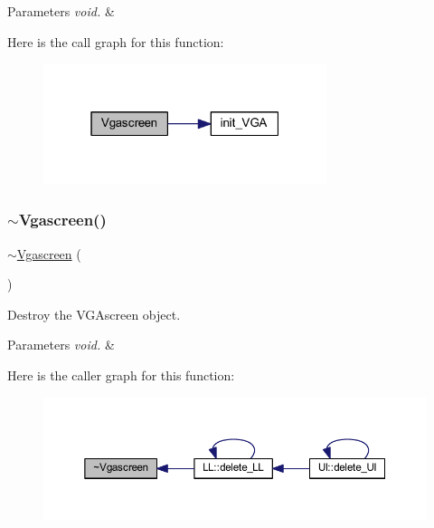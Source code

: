 \begin{DoxyParams}{Parameters}
{\em void.} & \\
\hline
\end{DoxyParams}
Here is the call graph for this function\+:\nopagebreak
\begin{figure}[H]
\begin{center}
\leavevmode
\includegraphics[width=235pt]{class_vgascreen_ad5914fac8c1af8491b92dfe780490191_cgraph}
\end{center}
\end{figure}
\mbox{\label{class_vgascreen_aac39d059f15042b0d763c6a173540552}} 
\subsubsection{\texorpdfstring{$\sim$\+Vgascreen()}{~Vgascreen()}}
{\footnotesize\ttfamily $\sim$\mbox{\hyperlink{class_vgascreen}{Vgascreen}} (\begin{DoxyParamCaption}\item[{void}]{ }\end{DoxyParamCaption})\hspace{0.3cm}{\ttfamily [virtual]}}



Destroy the V\+G\+Ascreen object. 


\begin{DoxyParams}{Parameters}
{\em void.} & \\
\hline
\end{DoxyParams}
Here is the caller graph for this function\+:\nopagebreak
\begin{figure}[H]
\begin{center}
\leavevmode
\includegraphics[width=350pt]{class_vgascreen_aac39d059f15042b0d763c6a173540552_icgraph}
\end{center}
\end{figure}



